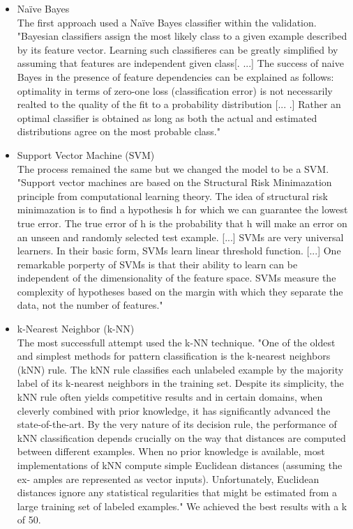 \documentclass[11pt,titlepage,oneside,openany]{book}
\begin{document}
\begin{itemize}
\item Na\"{i}ve Bayes \\
The first approach used a Na\"{i}ve Bayes classifier within the validation. "Bayesian classifiers assign the most likely class to a given example described by its feature vector. Learning such classifieres can be greatly simplified by assuming that features are independent given class[. ...] The success of naive Bayes in the presence of feature dependencies can be explained as follows: optimality in terms of zero-one loss (classification error) is not necessarily realted to the quality of the fit to a probability distribution [... .] Rather an optimal classifier is obtained as long as both the actual and estimated distributions agree on the most probable class." \citep[p.1]{Rish2001} 
\item Support Vector Machine (SVM) \\
The process remained the same but we changed the model to be a SVM. "Support vector machines are based on the Structural Risk Minimazation principle from computational learning theory. The idea of structural risk minimazation is to find a hypothesis h for which we can guarantee the lowest true error. The true error of h is the probability that h will make an error on an unseen and randomly selected test example. [...] SVMs are very universal learners. In their basic form, SVMs learn linear threshold function. [...] One remarkable porperty of SVMs is that their ability to learn can be independent of the dimensionality of the feature space. SVMs measure the complexity of hypotheses based on the margin with which they separate the data, not the number of features." \citep[p.2]{Joachims1998} 
\item k-Nearest Neighbor (k-NN) \\
The most successfull attempt used the k-NN technique. "One of the oldest and simplest methods for pattern classification is the k-nearest neighbors (kNN) rule. The kNN rule classifies each unlabeled example by the majority label of its k-nearest neighbors in the training set. Despite its simplicity, the kNN rule often yields competitive results and in certain domains, when cleverly combined with prior knowledge, it has significantly advanced the state-of-the-art. By the very nature of its decision rule, the performance of kNN classification depends crucially on the way that distances are computed between different examples. When no prior knowledge is available, most implementations of kNN compute simple Euclidean distances (assuming the ex- amples are represented as vector inputs). Unfortunately, Euclidean distances ignore any statistical regularities that might be estimated from a large training set of labeled examples." \citep[p.1]{Weinberger2006} We achieved the best results with a k of 50. 
\end{itemize}
\end{document}
